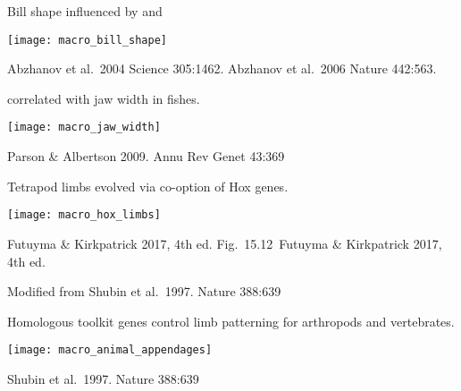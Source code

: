 \documentclass[t,handout]{beamer}  %
\newcommand{\futuyma}[1]{%
	\ifthenelse{\isempty{#1}}%
	{Futuyma \& Kirkpatrick 2017, 4th ed.}%
	{Fig.~#1~Futuyma \& Kirkpatrick 2017, 4th ed.}%
}
\newcommand{\backskip}{\vspace{-0.5\baselineskip}}
\begin{document}
\begin{frame}{Bill shape influenced by  and }

\backskip

\centering

\texttt{[image: macro\_bill\_shape]}

\tinyfill Abzhanov et al.~2004 Science 305:1462. Abzhanov et al.~2006 Nature 442:563.

\end{frame}


\begin{frame}{ correlated with jaw width in fishes.}

\backskip

\centering

\texttt{[image: macro\_jaw\_width]}

\tinyfill Parson \& Albertson 2009. Annu Rev Genet 43:369


\end{frame}



\begin{frame}{Tetrapod limbs evolved via co-option of Hox genes.}

\backskip

\centering

\texttt{[image: macro\_hox\_limbs]}

\tinyfill \futuyma{15.12}

\end{frame}


{
\begin{frame}[b]

\tinyfill Modified from Shubin et al.~1997. Nature 388:639

\end{frame}
}


\begin{frame}{Homologous toolkit genes control limb patterning for arthropods and vertebrates.}

\backskip

\centering

\texttt{[image: macro\_animal\_appendages]}

\tinyfill Shubin et al.~1997. Nature 388:639

\end{frame}
\end{document}
